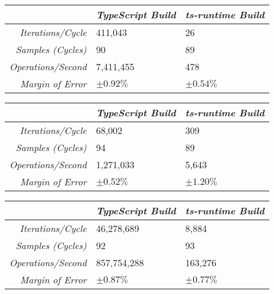 \begin{center}
{
\centering
\tabulinesep=1.2mm
\setlength{\tabcolsep}{5mm}
\def\arraystretch{1.25}
\small
\begin{tabu} to \textwidth {|r||X[c,m]|X[c,m]|}
  \hline
  & \emph{TypeScript Build} & \emph{ts-runtime Build} \\
  \hline
  \hline
  \emph{Iterations/Cycle}  & 411,043 & 26 \\
  \hline
  \emph{Samples (Cycles)}  & 90 & 89 \\
  \hline
  \emph{Operations/Second} & 7,411,455 & 478 \\
  \hline
  \emph{Margin of Error}   & $\pm 0.92\%$ & $\pm 0.54\%$ \\
  \hline
\end{tabu}
}
\end{center}

\begin{center}
{
\centering
\tabulinesep=1.2mm
\setlength{\tabcolsep}{5mm}
\def\arraystretch{1.25}
\small
\begin{tabu} to \textwidth {|r||X[c,m]|X[c,m]|}
  \hline
  & \emph{TypeScript Build} & \emph{ts-runtime Build} \\
  \hline
  \hline
  \emph{Iterations/Cycle}  & 68,002 & 309 \\
  \hline
  \emph{Samples (Cycles)}  & 94 & 89 \\
  \hline
  \emph{Operations/Second} & 1,271,033 & 5,643 \\
  \hline
  \emph{Margin of Error}   & $\pm 0.52\%$ & $\pm 1.20\%$ \\
  \hline
\end{tabu}
}
\end{center}

\begin{center}
{
\centering
\tabulinesep=1.2mm
\setlength{\tabcolsep}{5mm}
\def\arraystretch{1.25}
\small
\begin{tabu} to \textwidth {|r||X[c,m]|X[c,m]|}
  \hline
  & \emph{TypeScript Build} & \emph{ts-runtime Build} \\
  \hline
  \hline
  \emph{Iterations/Cycle}  & 46,278,689 & 8,884 \\
  \hline
  \emph{Samples (Cycles)}  & 92 & 93 \\
  \hline
  \emph{Operations/Second} & 857,754,288 & 163,276 \\
  \hline
  \emph{Margin of Error}   & $\pm 0.87\%$ & $\pm 0.77\%$ \\
  \hline
\end{tabu}
}
\end{center}

